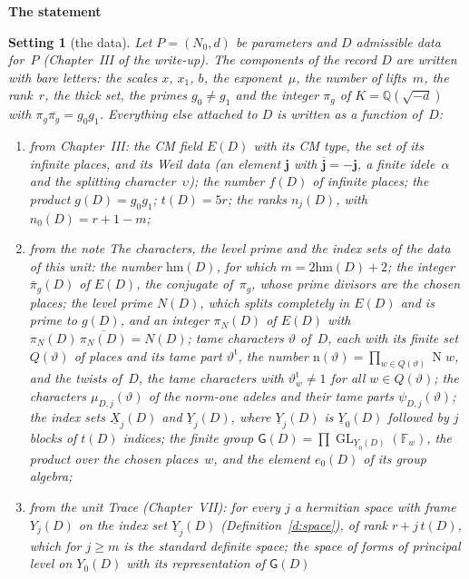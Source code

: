 \documentclass[11pt,a4paper]{article}
\newcommand{\m}[1]{\mbox{$#1$}}        %
\newcommand{\sect}[2]{\refstepcounter{section}\label{#2}\par\addvspace{19pt plus 4pt minus 2pt}\Needspace{7\baselineskip}%
  \noindent\llap{{\fontsize{13.2}{16}\selectfont\bfseries\color{inkfaint}\thesection}\hspace{9pt}}%
  {\fontsize{13.2}{16}\selectfont\bfseries\color{ink}#1}\par\nopagebreak\vspace{-1pt}}
\theoremstyle{plainx}
\theoremstyle{uprightx}
\newtheorem{setting}[theorem]{Setting}          %
\newcommand{\cj}[1]{\overline{#1}}
\newcommand{\Nm}{\operatorname{N}}
\newcommand{\GL}{\operatorname{GL}}
\newcommand{\ED}[1]{E(#1)}                         %
\newcommand{\ND}[1]{N(#1)}                         %
\newcommand{\piN}[1]{\pi_N(#1)}                    %
\newcommand{\piGb}[1]{\bar\pi_g(#1)}               %
\newcommand{\gD}[1]{g(#1)}                         %
\newcommand{\fD}[1]{f(#1)}                         %
\newcommand{\tD}[1]{t(#1)}                         %
\newcommand{\rhoD}[1]{\mathrm{hm}(#1)}                 %
\newcommand{\nD}[2]{n_{#2}(#1)}                    %
\newcommand{\XI}[2]{\underline{X}_{#2}(#1)}        %
\newcommand{\YI}[2]{\underline{Y}_{#2}(#1)}        %
\newcommand{\Ys}[2]{Y_{#2}(#1)}                    %
\newcommand{\GD}[1]{\mathsf{G}(#1)}                %
\newcommand{\ezero}[1]{e_0(#1)}                    %
\newcommand{\lvn}[1]{\mathrm{n}(#1)}               %
\newcommand{\Qs}[1]{Q(#1)}                         %
\newcommand{\muc}[3]{\mu_{#1,#3}(#2)}              %
\newcommand{\psic}[3]{\psi_{#1,#3}(#2)}            %
\begin{document}
\sect{The statement}{s:intro}

\begin{setting}[the data]\label{s:data}
Let $P=(N_0,d)$ be parameters and $D$ admissible data for~$P$ (Chapter~III of the write-up). The components of the
record $D$ are written with bare letters: the scales $x$, $x_1$, $b$, the exponent~$\mu$, the number of lifts~$m$,
the rank~$r$, the thick set, the primes \m{g_0\ne g_1} and the integer $\pi_g$ of \m{K=\mathbb{Q}(\sqrt{-d})} with
\m{\pi_g\cj{\pi_g}=g_0g_1}. Everything else attached to $D$ is written as a function of~$D$:
\begin{enumerate}[label=(\alph*)]
\item from Chapter~III: the CM field $\ED{D}$ with its CM type, the set of its infinite places, and its Weil data
  (an element $\mathbf{j}$ with \m{\cj{\mathbf{j}}=-\mathbf{j}}, a finite idele~$\alpha$ and the splitting
  character~$\upsilon$); the number $\fD{D}$ of infinite places; the product \m{\gD{D}=g_0g_1}; \m{\tD{D}=5r};
  the ranks $\nD{D}{j}$, with \m{\nD{D}{0}=r+1-m};
\item from the note \emph{The characters, the level prime and the index sets of the data} of this unit: the number
  $\rhoD{D}$, for which \m{m=2\rhoD{D}+2}; the integer $\piGb{D}$ of $\ED{D}$, the conjugate of~$\pi_g$, whose prime
  divisors are the \emph{chosen places}; the level prime $\ND{D}$, which splits completely in $\ED{D}$ and is prime
  to $\gD{D}$, and an integer $\piN{D}$ of $\ED{D}$ with \m{\piN{D}\,\cj{\piN{D}}=\ND{D}}; \emph{tame characters}
  $\vartheta$ of~$D$, each with its finite set $\Qs{\vartheta}$ of places and its tame part $\vartheta^{\mathrm{t}}$, the
  number $\lvn{\vartheta}=\prod_{w\in\Qs{\vartheta}}\Nm w$, and the \emph{twists} of~$D$, the tame characters with
  \m{\vartheta^{\mathrm{t}}_w\ne1} for all \m{w\in\Qs{\vartheta}}; the characters $\muc{D}{\vartheta}{j}$ of the norm-one
  adeles and their tame parts $\psic{D}{\vartheta}{j}$; the index sets $\XI{D}{j}$ and $\YI{D}{j}$, where $\YI{D}{j}$
  is $\YI{D}{0}$ followed by $j$ blocks of $\tD{D}$ indices; the finite group
  $\GD{D}=\prod\GL_{\YI{D}{0}}(\mathbb{F}_w)$, the product over the chosen places~$w$, and the element $\ezero{D}$
  of its group algebra;
\item from the unit \emph{Trace} (Chapter~VII): for every $j$ a hermitian space with frame $\Ys{D}{j}$ on the index
  set $\YI{D}{j}$ (Definition~\ref{d:space}), of rank \m{r+j\,\tD{D}}, which for \m{j\ge m} is the standard definite
  space; the space of forms of principal level on $\Ys{D}{0}$ with its representation of $\GD{D}$

\end{enumerate}
\end{setting}
\end{document}
